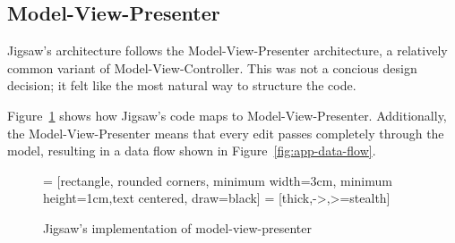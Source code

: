 \documentclass[12pt]{article}
\begin{document}
\subsection{Model-View-Presenter}

Jigsaw's architecture follows the Model-View-Presenter architecture, a relatively common variant of
Model-View-Controller.  This was not a concious design decision; it felt like the most natural way
to structure the code.

Figure~\ref{fig:model-view-presenter} shows how Jigsaw's code maps to Model-View-Presenter.
Additionally, the Model-View-Presenter means that every edit passes completely through the model,
resulting in a data flow shown in Figure~\ref{fig:app-data-flow}.

\begin{figure}
     = [rectangle, rounded corners, minimum width=3cm, minimum height=1cm,text
    centered, draw=black]
     = [thick,->,>=stealth]

    \centering
    \caption{Jigsaw's implementation of model-view-presenter}\label{fig:model-view-presenter}
\end{figure}
\end{document}
